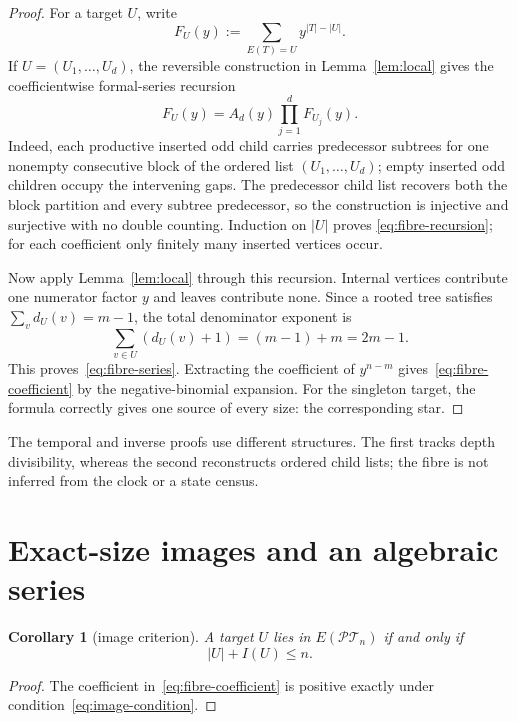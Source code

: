 \documentclass[a4paper,10pt]{amsart}
\newtheorem{corollary}[theorem]{Corollary}
\theoremstyle{definition}
\theoremstyle{remark}
\newcommand{\PT}{\mathcal{PT}}
\begin{document}
\begin{proof}
For a target $U$, write
\[
 F_U(y):=\sum_{E(T)=U}y^{|T|-|U|}.
\]
If $U=(U_1,\ldots,U_d)$, the reversible construction in
Lemma~\ref{lem:local} gives the coefficientwise formal-series recursion
\begin{equation}\label{eq:fibre-recursion}
                  F_U(y)=A_d(y)\prod_{j=1}^dF_{U_j}(y).
\end{equation}
Indeed, each productive inserted odd child carries predecessor subtrees for
one nonempty consecutive block of the ordered list $(U_1,\ldots,U_d)$;
empty inserted odd children occupy the intervening gaps.  The predecessor
child list recovers both the block partition and every subtree predecessor,
so the construction is injective and surjective with no double counting.
Induction on $|U|$ proves \eqref{eq:fibre-recursion}; for each coefficient
only finitely many inserted vertices occur.

Now apply Lemma~\ref{lem:local} through this recursion.  Internal vertices
contribute one numerator factor $y$ and leaves contribute none.  Since a
rooted tree satisfies
$\sum_vd_U(v)=m-1$, the total denominator exponent is
\[
              \sum_{v\in U}(d_U(v)+1)=(m-1)+m=2m-1.
\]
This proves~\eqref{eq:fibre-series}.  Extracting the coefficient of
$y^{n-m}$ gives~\eqref{eq:fibre-coefficient} by the negative-binomial
expansion.  For the singleton target, the formula correctly gives one source
of every size: the corresponding star.
\end{proof}

The temporal and inverse proofs use different structures.  The first tracks
depth divisibility, whereas the second reconstructs ordered child lists; the
fibre is not inferred from the clock or a state census.

\section{Exact-size images and an algebraic series}

\begin{corollary}[image criterion]\label{cor:image}
A target $U$ lies in $E(\PT_n)$ if and only if
\begin{equation}\label{eq:image-condition}
                     |U|+I(U)\le n.
\end{equation}
\end{corollary}

\begin{proof}
The coefficient in~\eqref{eq:fibre-coefficient} is positive exactly under
condition~\eqref{eq:image-condition}.
\end{proof}
\end{document}
